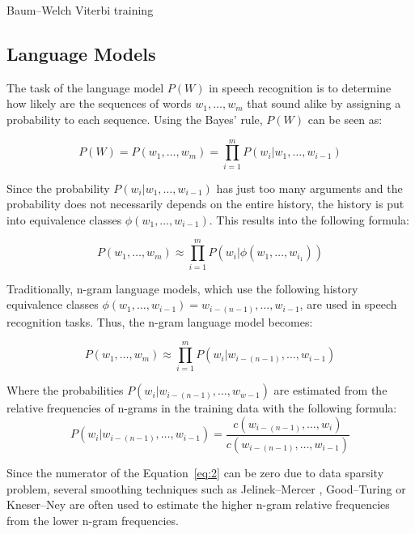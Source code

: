 Baum--Welch \cite{welch2003hidden}
Viterbi training \cite{franzini1990connectionist}

\subsection{Language Models}
The task of the language model $P(W)$ in speech recognition is
  to determine how likely are the sequences of words $w_1,\dots,w_m$ that sound alike
  by assigning a probability to each sequence.
Using the Bayes' rule, $P(W)$ can be seen as:

\begin{equation}
  P(W) = P(w_1,\dots,w_m) = \prod\limits_{i=1}^{m} P(w_i|w_1,\dots,w_{i-1})
\end{equation}

Since the probability $P(w_i|w_1,\dots,w_{i-1})$ has just too many arguments
  and the probability does not necessarily depends on the entire history,
  the history is put into equivalence classes $\phi(w_1,\dots,w_{i-1})$.
This results into the following formula:

\begin{equation}
  P(w_1,\dots,w_m) \approx \prod\limits_{i=1}^{m} P(w_i|\phi(w_1,\dots,w_{i_1}))
\end{equation}

Traditionally, n-gram language models,
  which use the following history equivalence classes $\phi(w_1,\dots,w_{i-1}) = w_{i-(n-1)},\dots,w_{i-1}$,
  are used in speech recognition tasks.
Thus, the n-gram language model becomes:

\begin{equation}
  P(w_1,\dots,w_m) \approx \prod\limits_{i=1}^{m} P(w_i|w_{i-(n-1)},\dots,w_{i-1})
\end{equation}

Where the probabilities $P(w_i|w_{i-(n-1)},\dots,w_{w-1})$ are estimated from the relative frequencies of n-grams in the training data with the following formula:
\begin{equation}
  \label{eq:2}
  P(w_i|w_{i-(n-1)},\dots,w_{i-1}) = \frac{c(w_{i-(n-1)},\dots,w_i)}{c(w_{i-(n-1)},\dots,w_{i-1})}
\end{equation}


Since the numerator of the Equation~\ref{eq:2} can be zero due to data sparsity problem,
  several smoothing techniques such as
  Jelinek--Mercer \cite{jelinek1980interpolated},
  Good--Turing \cite{gale1995good}
  or Kneser--Ney \cite{kneser1995improved} are often used to estimate the higher n-gram relative frequencies from the lower n-gram frequencies.

